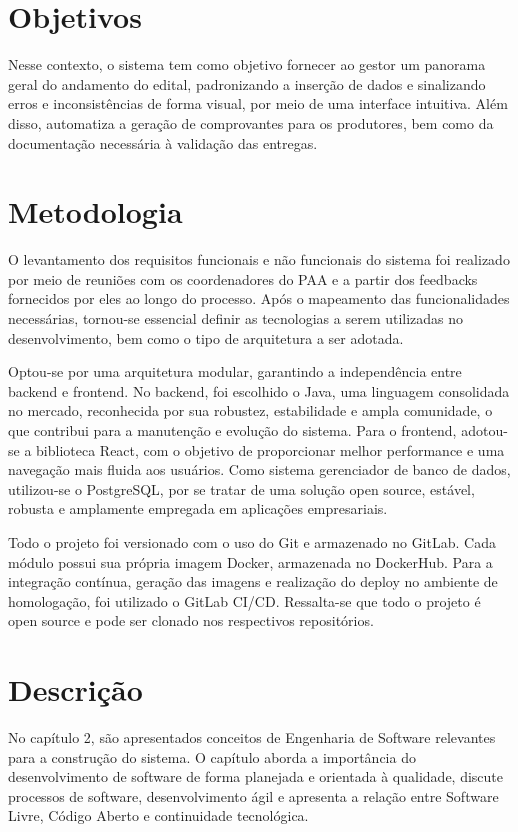 \documentclass[grad,pdftex]{poli}
\begin{document}
\section{Objetivos}

Nesse contexto, o sistema tem como objetivo fornecer ao gestor um panorama geral do andamento do edital, padronizando a inserção de dados e sinalizando erros e inconsistências de forma visual, por meio de uma interface intuitiva. Além disso, automatiza a geração de comprovantes para os produtores, bem como da documentação necessária à validação das entregas.

\section{Metodologia}

O levantamento dos requisitos funcionais e não funcionais do sistema foi realizado por meio de reuniões com os coordenadores do PAA e a partir dos feedbacks fornecidos por eles ao longo do processo. Após o mapeamento das funcionalidades necessárias, tornou-se essencial definir as tecnologias a serem utilizadas no desenvolvimento, bem como o tipo de arquitetura a ser adotada.

Optou-se por uma arquitetura modular, garantindo a independência entre backend e frontend. No backend, foi escolhido o Java, uma linguagem consolidada no mercado, reconhecida por sua robustez, estabilidade e ampla comunidade, o que contribui para a manutenção e evolução do sistema. Para o frontend, adotou-se a biblioteca React, com o objetivo de proporcionar melhor performance e uma navegação mais fluida aos usuários. Como sistema gerenciador de banco de dados, utilizou-se o PostgreSQL, por se tratar de uma solução open source, estável, robusta e amplamente empregada em aplicações empresariais.

Todo o projeto foi versionado com o uso do Git e armazenado no GitLab. Cada módulo possui sua própria imagem Docker, armazenada no DockerHub. Para a integração contínua, geração das imagens e realização do deploy no ambiente de homologação, foi utilizado o GitLab CI/CD. Ressalta-se que todo o projeto é open source e pode ser clonado nos respectivos repositórios.


\section{Descrição}

No capítulo 2, são apresentados conceitos de Engenharia de Software relevantes para a construção do sistema. O capítulo aborda a importância do desenvolvimento de software de forma planejada e orientada à qualidade, discute processos de software, desenvolvimento ágil e apresenta a relação entre Software Livre, Código Aberto e continuidade tecnológica.
\end{document}
